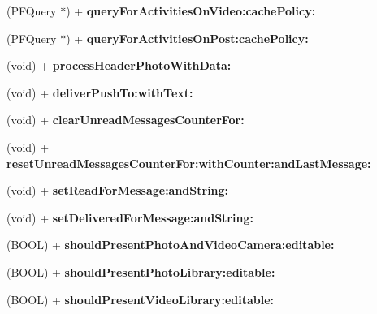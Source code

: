 \begin{DoxyCompactItemize}
\item 
\hypertarget{interface_e_s_utility_a3ef7cf87baf1efab0555450661a1b37f}{}(P\+F\+Query $\ast$) + {\bfseries query\+For\+Activities\+On\+Video\+:cache\+Policy\+:}\label{interface_e_s_utility_a3ef7cf87baf1efab0555450661a1b37f}

\item 
\hypertarget{interface_e_s_utility_a7ab606521932eded4ba5edb20254d9bd}{}(P\+F\+Query $\ast$) + {\bfseries query\+For\+Activities\+On\+Post\+:cache\+Policy\+:}\label{interface_e_s_utility_a7ab606521932eded4ba5edb20254d9bd}

\item 
\hypertarget{interface_e_s_utility_a51534134b7e8ab3c756292d013b809a7}{}(void) + {\bfseries process\+Header\+Photo\+With\+Data\+:}\label{interface_e_s_utility_a51534134b7e8ab3c756292d013b809a7}

\item 
\hypertarget{interface_e_s_utility_a99c825830894801e73cc8b6e45cf8c49}{}(void) + {\bfseries deliver\+Push\+To\+:with\+Text\+:}\label{interface_e_s_utility_a99c825830894801e73cc8b6e45cf8c49}

\item 
\hypertarget{interface_e_s_utility_a06ce26eb140386233ed5ab72b5d1cab7}{}(void) + {\bfseries clear\+Unread\+Messages\+Counter\+For\+:}\label{interface_e_s_utility_a06ce26eb140386233ed5ab72b5d1cab7}

\item 
\hypertarget{interface_e_s_utility_a33c63aa294e65e21095cee82d57500a7}{}(void) + {\bfseries reset\+Unread\+Messages\+Counter\+For\+:with\+Counter\+:and\+Last\+Message\+:}\label{interface_e_s_utility_a33c63aa294e65e21095cee82d57500a7}

\item 
\hypertarget{interface_e_s_utility_a1105c91a2cbcc889fc9a15e38019869d}{}(void) + {\bfseries set\+Read\+For\+Message\+:and\+String\+:}\label{interface_e_s_utility_a1105c91a2cbcc889fc9a15e38019869d}

\item 
\hypertarget{interface_e_s_utility_a6f2ddb531323832add230fba43fef3d9}{}(void) + {\bfseries set\+Delivered\+For\+Message\+:and\+String\+:}\label{interface_e_s_utility_a6f2ddb531323832add230fba43fef3d9}

\item 
\hypertarget{interface_e_s_utility_a9e1493d01cc27f6b84ea6daf53a0f9b9}{}(B\+O\+O\+L) + {\bfseries should\+Present\+Photo\+And\+Video\+Camera\+:editable\+:}\label{interface_e_s_utility_a9e1493d01cc27f6b84ea6daf53a0f9b9}

\item 
\hypertarget{interface_e_s_utility_a2d3f9151ecc8fc7dbd58255316fff23c}{}(B\+O\+O\+L) + {\bfseries should\+Present\+Photo\+Library\+:editable\+:}\label{interface_e_s_utility_a2d3f9151ecc8fc7dbd58255316fff23c}

\item 
\hypertarget{interface_e_s_utility_a1ea0e69879d3f5f0f6ee8518e7ae8645}{}(B\+O\+O\+L) + {\bfseries should\+Present\+Video\+Library\+:editable\+:}\label{interface_e_s_utility_a1ea0e69879d3f5f0f6ee8518e7ae8645}

\end{DoxyCompactItemize}


